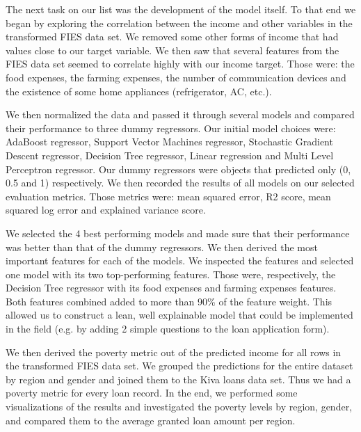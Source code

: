 \documentclass{article}
\begin{document}
The next task on our list was the development of the model itself. To that end we began by exploring the correlation between the income and other variables in the transformed FIES data set. We removed some other forms of income that had values close to our target variable. We then saw that several features from the FIES data set seemed to correlate highly with our income target. Those were: the food expenses, the farming expenses, the number of communication devices and the existence of some home appliances (refrigerator, AC, etc.).

We then normalized the data and passed it through several models and compared their performance to three dummy regressors. Our initial model choices were: AdaBoost regressor, Support Vector Machines regressor, Stochastic Gradient Descent regressor, Decision Tree regressor, Linear regression and Multi Level Perceptron regressor. Our dummy regressors were objects that predicted only (0, 0.5 and 1) respectively. We then recorded the results of all models on our selected evaluation metrics. Those metrics were: mean squared error, R2 score, mean squared log error and explained variance score.

We selected the 4 best performing models and made sure that their performance was better than that of the dummy regressors. We then derived the most important features for each of the models. We inspected the features and selected one model with its two top-performing features. Those were, respectively, the Decision Tree regressor with its food expenses and farming expenses features. Both features combined added to more than 90\% of the feature weight. This allowed us to construct a lean, well explainable model that could be implemented in the field (e.g. by adding 2 simple questions to the loan application form).

We then derived the poverty metric out of the predicted income for all rows in the transformed FIES data set. We grouped the predictions for the entire dataset by region and gender and joined them to the Kiva loans data set. Thus we had a poverty metric for every loan record. In the end, we performed some visualizations of the results and investigated the poverty levels by region, gender, and compared them to the average granted loan amount per region.
\end{document}
